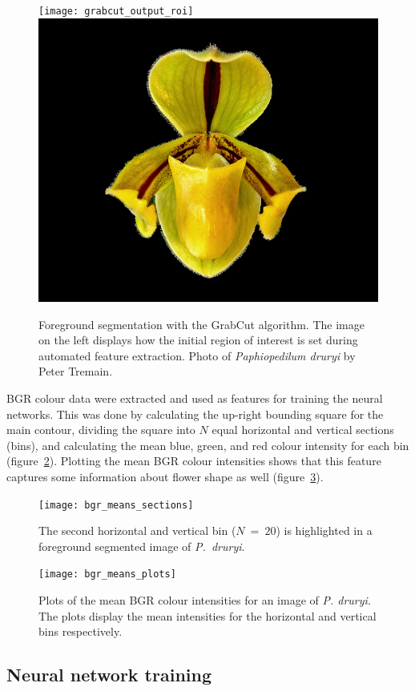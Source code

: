 \documentclass[twocolumn]{bmcart}
\begin{document}
\begin{figure}[t]
    \centering
    \minipage{\textwidth}
        \texttt{[image: grabcut\_output\_roi]}
        \includegraphics[width=0.48\linewidth]{grabcut_output}
    \endminipage
    \caption{Foreground segmentation with the GrabCut algorithm. The image on the left displays how the initial region of interest is set during automated feature extraction. Photo of \textit{Paphiopedilum druryi} by Peter Tremain.}
    \label{fig:grabcut-output}
\end{figure}

BGR colour data were extracted and used as features for training the neural networks. This was done by calculating the up-right bounding square for the main contour, dividing the square into $N$ equal horizontal and vertical sections (bins), and calculating the mean blue, green, and red colour intensity for each bin (figure~\ref{fig:bgr-means-sections}). Plotting the mean BGR colour intensities shows that this feature captures some information about flower shape as well (figure~\ref{fig:bgr-means-plots}).

\begin{figure}[h]
    \centering
    \texttt{[image: bgr\_means\_sections]}
    \caption{The second horizontal and vertical bin ($N~=~20$) is highlighted in a foreground segmented image of \textit{P.~druryi}.}
    \label{fig:bgr-means-sections}
\end{figure}

\begin{figure}[t]
    \centering
    \texttt{[image: bgr\_means\_plots]}
    \caption{Plots of the mean BGR colour intensities for an image of \textit{P. druryi}. The plots display the mean intensities for the horizontal and vertical bins respectively.}
    \label{fig:bgr-means-plots}
\end{figure}

\subsection{Neural network training}
\end{document}

